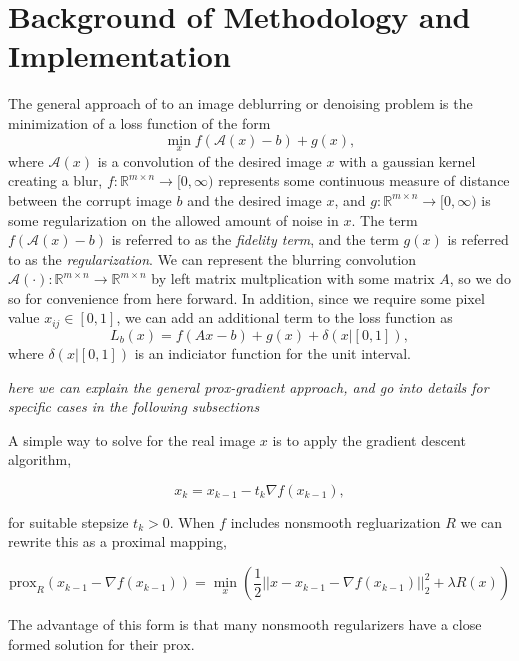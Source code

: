 \documentclass[10pt,a4paper]{article}
\newcommand{\prox}{\mathrm{prox}}
\newcommand{\R}{\mathbb{R}}
\begin{document}
\section{Background of Methodology and Implementation}
The general approach of to an image deblurring or denoising problem is the minimization of a loss function of the form
\begin{equation} \label{general}
 \min_x f(\mathcal{A}(x) -b) + g(x),
\end{equation}
where $\mathcal{A}(x)$ is a convolution of the desired image $x$ with a gaussian kernel creating a blur,  $f : \R^{m \times n} \rightarrow [0, \infty)$ represents some continuous measure of distance between the corrupt image $b$ and the desired image $x$, and $g:\R^{m \times n} \rightarrow [0,\infty)$ is some regularization on the allowed amount of noise in $x$. The term $f(\mathcal{A}(x)-b)$ is referred to as the \emph{fidelity term}, and the term $g(x)$ is referred to as the \emph{regularization}. We can represent the blurring convolution $\mathcal{A}(\cdot): \R^{m \times n} \rightarrow \R^{m \times n}$ by left matrix multplication with some matrix $A$, so we do so for convenience from here forward. In addition, since we require some pixel value $x_{ij} \in [0,1]$, we can add an additional term to the loss function as
\begin{equation} \label{loss}
 L_b(x) = f(Ax-b) + g(x) + \delta(x | [0,1] ),
\end{equation}
where $\delta(x | [0,1])$ is an indiciator function for the unit interval. 

\emph{here we can explain the general prox-gradient approach, and go into details for specific cases in the following subsections}


A simple way to solve for the real image $x$ is to apply the gradient descent algorithm,

\begin{equation}
x_k = x_{k-1} - t_k \nabla f(x_{k-1}),
\end{equation}

for suitable stepsize $t_k > 0$. When $f$ includes nonsmooth regluarization $R$ we can rewrite this as a proximal mapping,

\begin{equation}
\prox_R(x_{k-1} - \nabla f(x_{k-1})) = \min_x \left( \frac{1}{2}||x-x_{k-1} - \nabla f(x_{k-1})||_2^2  + \lambda R(x)\right)
\end{equation}

The advantage of this form is that many nonsmooth regularizers have a close formed solution for their $\prox$.
\end{document}

